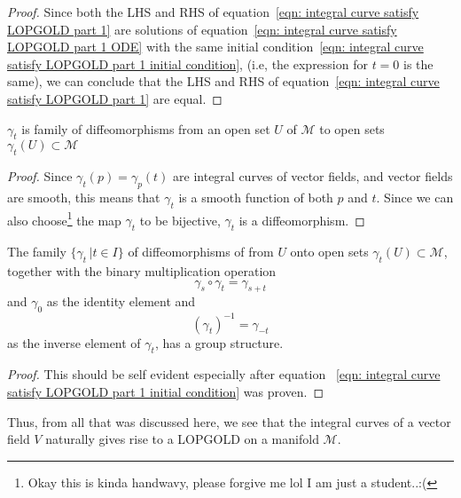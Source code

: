 \begin{proof}
        Since both the LHS and RHS of equation~\ref{eqn: integral curve
        satisfy LOPGOLD part 1} are solutions of equation~\ref{eqn: integral
        curve satisfy LOPGOLD part 1 ODE} with the same initial
        condition~\ref{eqn: integral curve satisfy LOPGOLD part 1 initial
        condition}, (i.e, the expression for $t=0$ is the same), we can
        conclude that the LHS and RHS of equation~\ref{eqn: integral curve
        satisfy LOPGOLD part 1} are equal.
      \end{proof}
      \begin{theorem}
        $\gamma_t$ is family of diffeomorphisms from an open set $U$ of
        $\mathcal{M}$ to open sets $\gamma_t(U) \subset \mathcal{M}$
      \end{theorem}
      \begin{proof}
        Since $\gamma_t(p) = \gamma_p(t)$ are integral curves of vector
        fields, and vector fields are smooth, this means that $\gamma_t$ is a
        smooth function of both $p$ and $t$. Since we can also
        choose\footnote{Okay this is kinda handwavy, please forgive me lol I
        am just a student..:(} the map $\gamma_t$ to be bijective,
        $\gamma_t$ is a diffeomorphism.
      \end{proof}
      \begin{theorem}
        The family $\{\gamma_t \, |t\in I\}$ of diffeomorphisms of from $U$
        onto open sets $\gamma_t(U) \subset \mathcal{M}$, together with the
        binary multiplication operation
          \[\gamma_s \circ \gamma_t = \gamma_{s+t}\]
        and $\gamma_{0}$ as the identity element and
        \[(\gamma_t)^{-1} = \gamma_{-t}\] as the inverse element of
        $\gamma_t$, has a group structure.
      \end{theorem}
      \begin{proof}
        This should be self evident especially after equation~ \ref{eqn:
        integral curve satisfy LOPGOLD part 1 initial condition} was proven.
      \end{proof}
      Thus, from all that was discussed here, we see that the integral curves
      of a vector field $V$ naturally gives rise to a LOPGOLD on a manifold
      $\mathcal{M}$.
